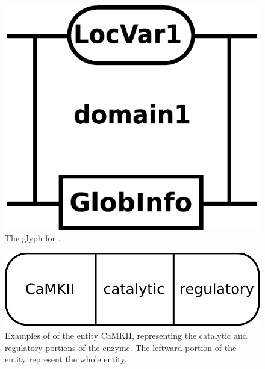 \begin{figure}[H]
  \centering
  \includegraphics[scale = 0.3]{images/domain}
  \caption{The \ER glyph for .}
  \label{fig:domain}
\end{figure}

\begin{figure}[H]
  \centering
  \includegraphics[scale = 0.5]{examples/ex-domain}
  \caption{Examples of  of the entity CaMKII, representing the catalytic and regulatory portions of the enzyme. The leftward portion of the entity represent the whole entity.}
  \label{fig:ex-domain}
\end{figure}

\normalcolor